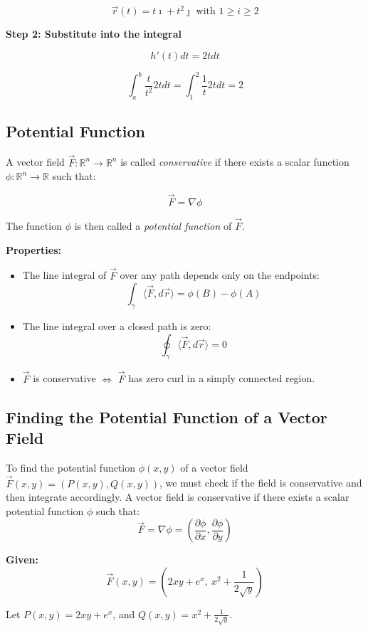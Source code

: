 \[
\vec{r}(t) = t\imath + t^2 \jmath \text{ with } 1 \ge i \ge 2
\]

\textbf{Step 2: Substitute into the integral}

\[
h'(t)dt= 2t dt
\]

\[
\int_{a}^{b} \frac{t}{t^2} 2tdt = \int_{1}^{2} \frac{1}{t} 2tdt = 2 
\]

\subsection{Potential Function}

A vector field \( \vec{F} : \mathbb{R}^n \to \mathbb{R}^n \) is called \emph{conservative} if there exists a scalar function \( \phi : \mathbb{R}^n \to \mathbb{R} \) such that:

\[
\vec{F} = \nabla \phi
\]

The function \( \phi \) is then called a \emph{potential function} of \( \vec{F} \).

\textbf{Properties:}
\begin{itemize}[label=\(-\)]
    \item The line integral of \( \vec{F} \) over any path depends only on the endpoints:
    \[
    \int_\gamma \langle \vec{F}, d\vec{r} \rangle = \phi(B) - \phi(A)
    \]
    \item The line integral over a closed path is zero:
    \[
    \oint_\gamma \langle \vec{F}, d\vec{r} \rangle = 0
    \]
    \item \( \vec{F} \) is conservative \( \Leftrightarrow \) \( \vec{F} \) has zero curl in a simply connected region.
\end{itemize}

\subsection{Finding the Potential Function of a Vector Field}

To find the potential function \( \phi(x, y) \) of a vector field \( \vec{F}(x, y) = (P(x, y), Q(x, y)) \), we must check if the field is conservative and then integrate accordingly. A vector field is conservative if there exists a scalar potential function \( \phi \) such that:
\[
\vec{F} = \nabla \phi = \left( \frac{\partial \phi}{\partial x}, \frac{\partial \phi}{\partial y} \right)
\]

\textbf{Given:}
\[
\vec{F}(x, y) = \left(2xy + e^x,\ x^2 + \frac{1}{2\sqrt{y}}\right)
\]

Let \( P(x, y) = 2xy + e^x \), and \( Q(x, y) = x^2 + \frac{1}{2\sqrt{y}} \).

